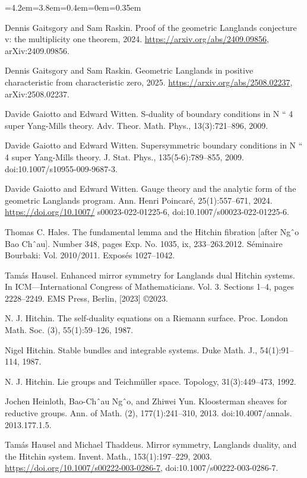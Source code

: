 \begin{list}{}{\leftmargin=4.2em=3.8em=0.4em\itemindent=0em\parsep=0.35em}
\item[{GR24b}] Dennis Gaitsgory and Sam Raskin. Proof of the geometric Langlands conjecture v: the multiplicity one theorem, 2024. \url{https://arxiv.org/abs/2409.09856}, arXiv:2409.09856.
\item[{GR25}] Dennis Gaitsgory and Sam Raskin. Geometric Langlands in positive characteristic from characteristic zero, 2025. \url{https://arxiv.org/abs/2508.02237}, arXiv:2508.02237.
\item[{GW09a}] Davide Gaiotto and Edward Witten. S-duality of boundary conditions in N “ 4 super Yang-Mills theory. Adv. Theor. Math. Phys., 13(3):721–896, 2009.
\item[{GW09b}] Davide Gaiotto and Edward Witten. Supersymmetric boundary conditions in N “ 4 super Yang-Mills theory. J. Stat. Phys., 135(5-6):789–855, 2009. doi:10.1007/s10955-009-9687-3.
\item[{GW24}] Davide Gaiotto and Edward Witten. Gauge theory and the analytic form of the geometric Langlands program. Ann. Henri Poincaré, 25(1):557–671, 2024. \url{https://doi.org/10.1007/} s00023-022-01225-6, doi:10.1007/s00023-022-01225-6.
\item[{Hal12}] Thomas C. Hales. The fundamental lemma and the Hitchin fibration [after Ngˆo Bao Chˆau]. Number 348, pages Exp. No. 1035, ix, 233–263.2012. Séminaire Bourbaki: Vol. 2010/2011. Exposés 1027–1042.
\item[{Hau23}] Tamás Hausel. Enhanced mirror symmetry for Langlands dual Hitchin systems. In ICM—International Congress of Mathematicians. Vol. 3. Sections 1–4, pages 2228–2249. EMS Press, Berlin, [2023] ©2023.
\item[{Hit87a}] N. J. Hitchin. The self-duality equations on a Riemann surface. Proc. London Math. Soc. (3), 55(1):59–126, 1987.
\item[{Hit87b}] Nigel Hitchin. Stable bundles and integrable systems. Duke Math. J., 54(1):91–114, 1987.
\item[{Hit92}] N. J. Hitchin. Lie groups and Teichmüller space. Topology, 31(3):449–473, 1992.
\item[{HNY13}] Jochen Heinloth, Bao-Chˆau Ngˆo, and Zhiwei Yun. Kloosterman sheaves for reductive groups. Ann. of Math. (2), 177(1):241–310, 2013. doi:10.4007/annals. 2013.177.1.5.
\item[{HT03}] Tamás Hausel and Michael Thaddeus. Mirror symmetry, Langlands duality, and the Hitchin system. Invent. Math., 153(1):197–229, 2003. \url{https://doi.org/10.1007/s00222-003-0286-7}, doi:10.1007/s00222-003-0286-7.

\end{list}
